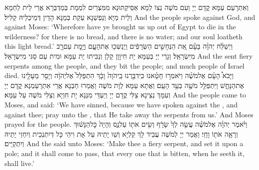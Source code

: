 {וְאִתְרָעַם עַמָּא קֳדָם יְיָ וְעִם מֹשֶׁה נְצוֹ לְמָא אַסֵּיקְתּוּנָא מִמִּצְרַיִם לִמְמָת בְּמַדְבְּרָא אֲרֵי לֵית לַחְמָא וְלֵית מַיָּא וְנַפְשַׁנָא עַקַת בְּמַנָּא הָדֵין דְּמֵיכְלֵיהּ קַלִּיל׃}
{And the people spoke against God, and against Moses: ‘Wherefore have ye brought us up out of Egypt to die in the wilderness? for there is no bread, and there is no water; and our soul loatheth this light bread.’}{}
{וַיְשַׁלַּ֨ח יְהֹוָ֜ה בָּעָ֗ם אֵ֚ת הַנְּחָשִׁ֣ים הַשְּׂרָפִ֔ים וַֽיְנַשְּׁכ֖וּ אֶת\maqqaf הָעָ֑ם וַיָּ֥מׇת עַם\maqqaf רָ֖ב מִיִּשְׂרָאֵֽל׃}
{וְגָרֵי יְיָ בְּעַמָּא יָת חִיוָוָן קָלַן וְנַכִּיתוּ יָת עַמָּא וּמִית עַם סַגִּי מִיִּשְׂרָאֵל׃}
{And the \lord\space sent fiery serpents among the people, and they bit the people; and much people of Israel died.}{}
{וַיָּבֹא֩ הָעָ֨ם אֶל\maqqaf מֹשֶׁ֜ה וַיֹּאמְר֣וּ חָטָ֗אנוּ כִּֽי\maqqaf דִבַּ֤רְנוּ בַֽיהֹוָה֙ וָבָ֔ךְ הִתְפַּלֵּל֙ אֶל\maqqaf יְהֹוָ֔ה וְיָסֵ֥ר מֵעָלֵ֖ינוּ אֶת\maqqaf הַנָּחָ֑שׁ וַיִּתְפַּלֵּ֥ל מֹשֶׁ֖ה בְּעַ֥ד הָעָֽם׃}
{וַאֲתָא עַמָּא לְוָת מֹשֶׁה וַאֲמַרוּ חַבְנָא אֲרֵי אִתְרָעַמְנָא קֳדָם יְיָ וְעִמָּךְ נְצֵינָא צַלִּי קֳדָם יְיָ וְיַעְדֵּי מִנַּנָא יָת חִוְיָא וְצַלִּי מֹשֶׁה עַל עַמָּא׃}
{And the people came to Moses, and said: ‘We have sinned, because we have spoken against the \lord, and against thee; pray unto the \lord, that He take away the serpents from us.’ And Moses prayed for the people.}{}
{וַיֹּ֨אמֶר יְהֹוָ֜ה אֶל\maqqaf מֹשֶׁ֗ה עֲשֵׂ֤ה לְךָ֙ שָׂרָ֔ף וְשִׂ֥ים אֹת֖וֹ עַל\maqqaf נֵ֑ס וְהָיָה֙ כׇּל\maqqaf הַנָּשׁ֔וּךְ וְרָאָ֥ה אֹת֖וֹ וָחָֽי׃}
{וַאֲמַר יְיָ לְמֹשֶׁה עֲבֵיד לָךְ קַלְיָא וְשַׁו יָתֵיהּ עַל אָת וִיהֵי כָּל דְּיִתְנְכֵית וְיִחְזֵי יָתֵיהּ וְיִתְקַיַּים׃}
{And the \lord\space said unto Moses: ‘Make thee a fiery serpent, and set it upon a pole; and it shall come to pass, that every one that is bitten, when he seeth it, shall live.’}{}

